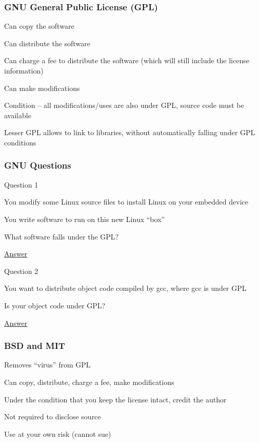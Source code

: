 \documentclass[t,12pt,numbers,fleqn]{beamer}
\begin{document}

\begin{frame}
\frametitle{GNU General Public License (GPL)}

\bi
\item Can copy the software
\item Can distribute the software
\item Can charge a fee to distribute the software (which will still include the license information)
\item Can make modifications
\item Condition -- all modifications/uses are also under GPL, source
  code must be available
\item Lesser GPL allows to link to libraries, without automatically falling under
  GPL conditions
\ei

\end{frame}


\begin{frame}
\frametitle{GNU Questions}

\bi
\item Question 1
\bi
\item You modify some Linux source files to install Linux on your embedded
  device
\item You write software to run on this new Linux ``box''
\item What software falls under the GPL?
\item \href{http://www.softwarefreedom.org/resources/2008/compliance-guide.html}{Answer}
\ei
\item Question 2
\bi
\item You want to distribute object code compiled by gcc, where gcc is under GPL
\item Is your object code under GPL?
\item \href{https://www.gnu.org/licenses/gcc-exception-3.1-faq.en.html}{Answer}
\ei
\ei

\end{frame}


\begin{frame}
\frametitle{BSD and MIT}

\bi
\item Removes ``virus'' from GPL
\item Can copy, distribute, charge a fee, make modifications
\item Under the condition that you keep the license intact, credit the author
\item Not required to disclose source 
\item Use at your own risk (cannot sue)
\ei

\end{frame}
\end{document}
